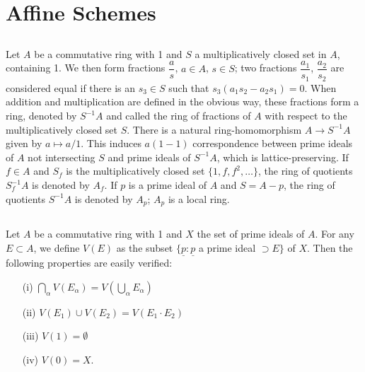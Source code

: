 \chapter{Affine Schemes}\label{chap1}


\section{}\pageoriginale\label{chap1-sec1.1}

Let $A$ be a commutative ring with 1 and $S$ a multiplicatively closed
set in $A$, containing 1. We then form fractions $\dfrac{a}{s}$, $a\in
A$, $s\in S$; two fractions $\dfrac{a_{1}}{s_{1}}$,
$\dfrac{a_{2}}{s_{2}}$ are considered equal if there is an $s_{3}\in
S$ such that $s_{3}(a_{1}s_{2}-a_{2}s_{1})=0$. When  addition and
multiplication are defined in the obvious way, these fractions form a
ring, denoted by $S^{-1}A$ and called the ring of fractions of $A$
with respect to the multiplicatively closed set $S$. There is a
natural ring-homomorphism $A\to S^{-1}A$ given by $a\mapsto a/1$. This
induces $a(1-1)$ correspondence between prime ideals of $A$ not
intersecting $S$ and prime ideals of $S^{-1}A$, which is
lattice-preserving. If $f\in A$ and $S_{f}$ is the multiplicatively
closed set $\{1,f,f^{2},\ldots\}$, the ring of quotients $S^{-1}_{f}A$
is denoted by $A_{f}$. If $p$ is a prime ideal of $A$ and $S=A-p$, the
ring of quotients $S^{-1}A$ is denoted by $A_{p}$; $A_{p}$ is a local
ring. 

\section{}\label{chap1-sec1.2}
Let $A$ be a commutative ring with 1 and $X$ the set of prime ideals
of $A$. For any $E\subset A$, we define $V(E)$ as the subset
$\{\underline{p}:\underline{p}$ a prime ideal $\supset E\}$ of
$X$. Then the following properties are easily verified:
\begin{itemize}
\item[(i)] $\bigcap\limits_{\alpha}V(E_{\alpha})=V(\bigcup\limits_{\alpha}E_{\alpha})$\pageoriginale

\item[(ii)] $V(E_{1})\cup V(E_{2})=V(E_{1}\cdot E_{2})$

\item[(iii)] $V(1)=\emptyset$

\item[(iv)] $V(0)=X$.
\end{itemize}

